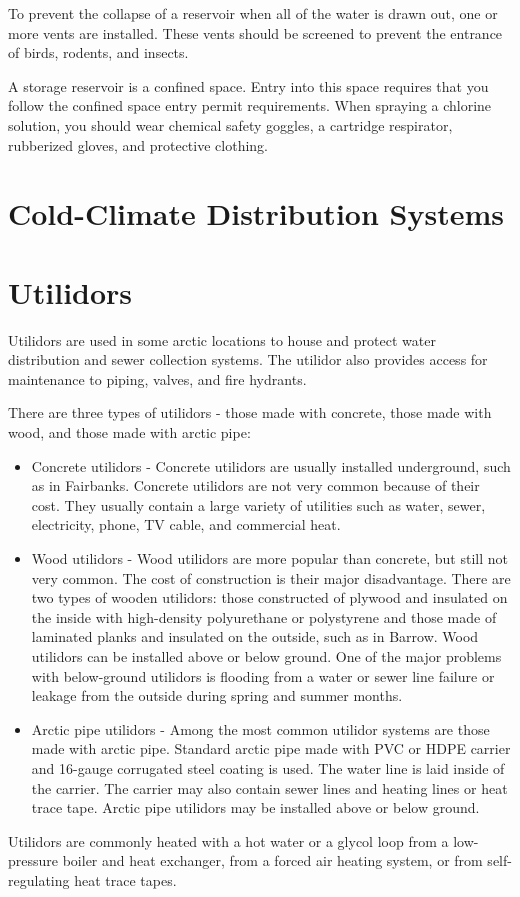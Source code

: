 \documentclass[10pt]{article}
\begin{document}
To prevent the collapse of a reservoir when all of the water is drawn out, one or more vents are installed. These vents should be screened to prevent the entrance of birds, rodents, and insects.

A storage reservoir is a confined space. Entry into this space requires that you follow the confined space entry permit requirements. When spraying a chlorine solution, you should wear chemical safety goggles, a cartridge respirator, rubberized gloves, and protective clothing.

\section{Cold-Climate Distribution Systems}
\section{Utilidors}
Utilidors are used in some arctic locations to house and protect water distribution and sewer collection systems. The utilidor also provides access for maintenance to piping, valves, and fire hydrants.

There are three types of utilidors - those made with concrete, those made with wood, and those made with arctic pipe:

\begin{itemize}
  \item Concrete utilidors - Concrete utilidors are usually installed underground, such as in Fairbanks. Concrete utilidors are not very common because of their cost. They usually contain a large variety of utilities such as water, sewer, electricity, phone, TV cable, and commercial heat.

  \item Wood utilidors - Wood utilidors are more popular than concrete, but still not very common. The cost of construction is their major disadvantage. There are two types of wooden utilidors: those constructed of plywood and insulated on the inside with high-density polyurethane or polystyrene and those made of laminated planks and insulated on the outside, such as in Barrow. Wood utilidors can be installed above or below ground. One of the major problems with below-ground utilidors is flooding from a water or sewer line failure or leakage from the outside during spring and summer months.

  \item Arctic pipe utilidors - Among the most common utilidor systems are those made with arctic pipe. Standard arctic pipe made with PVC or HDPE carrier and 16-gauge corrugated steel coating is used. The water line is laid inside of the carrier. The carrier may also contain sewer lines and heating lines or heat trace tape. Arctic pipe utilidors may be installed above or below ground.

\end{itemize}
Utilidors are commonly heated with a hot water or a glycol loop from a low-pressure boiler and heat exchanger, from a forced air heating system, or from self-regulating heat trace tapes.
\end{document}
